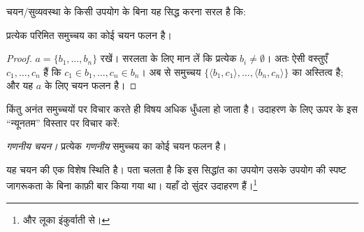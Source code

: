 \documentclass[../../../include/open-logic-section]{subfiles}
\begin{document}

चयन/सुव्यवस्था के किसी उपयोग के बिना यह सिद्ध करना सरल है कि:

\begin{lem}[$\Zminus$ में]
प्रत्येक परिमित समुच्चय का कोई चयन फलन है।
\end{lem}

\begin{proof}
$a=\{b_1,\ldots,b_n\}$ रखें। सरलता के लिए मान लें कि प्रत्येक
$b_i\neq\emptyset$। अतः ऐसी वस्तुएँ $c_1,\ldots,c_n$ हैं कि
$c_1\in b_1,\ldots,c_n\in b_n$। अब
 से समुच्चय
$\{\langle b_1,c_1\rangle,\ldots,\langle b_n,c_n\rangle\}$ का अस्तित्व है;
और यह $a$ के लिए चयन फलन है।
\end{proof}

किंतु अनंत समुच्चयों पर विचार करते ही विषय अधिक धुँधला हो जाता है। उदाहरण
के लिए ऊपर के इस ``न्यूनतम'' विस्तार पर विचार करें:

\begin{defish}
\emph{गणनीय चयन।} प्रत्येक \emph{गणनीय} समुच्चय का कोई चयन फलन है।
\end{defish}

यह चयन की एक विशेष स्थिति है। पता चलता है कि इस सिद्धांत का उपयोग उसके
उपयोग की स्पष्ट जागरूकता के बिना काफ़ी बार किया गया था। यहाँ दो सुंदर उदाहरण
हैं।\footnote{\citet[\S9.4]{Potter2004} और लूका इंकुर्वाती से।}
\end{document}
